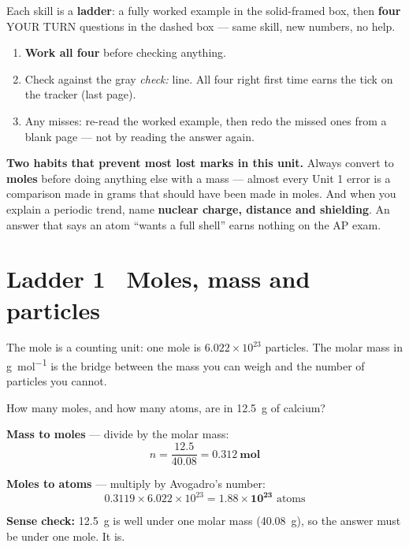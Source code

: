 \documentclass{apchem-worksheet}
\begin{document}
\apctitleblock

\begin{apcnote}
Each skill is a \textbf{ladder}: a fully worked example in the
solid-framed box, then \textbf{four} YOUR TURN questions in the dashed box
--- same skill, new numbers, no help.

\begin{enumerate}[leftmargin=*,itemsep=0.15em]
  \item \textbf{Work all four} before checking anything.
  \item Check against the gray \emph{check:} line. All four right first
        time earns the tick on the tracker (last page).
  \item Any misses: re-read the worked example, then redo the missed ones
        from a blank page --- not by reading the answer again.
\end{enumerate}

\textbf{Two habits that prevent most lost marks in this unit.} Always
convert to \textbf{moles} before doing anything else with a mass ---
almost every Unit 1 error is a comparison made in grams that should have
been made in moles. And when you explain a periodic trend, name
\textbf{nuclear charge, distance and shielding}. An answer that says an
atom ``wants a full shell'' earns nothing on the AP exam.
\end{apcnote}

\section*{\sffamily Ladder 1 \textbullet\ Moles, mass and particles}

The mole is a counting unit: one mole is
$6.022\times10^{23}$ particles. The molar mass in
\si{\gram\per\mole} is the bridge between the mass you can weigh and the
number of particles you cannot.

\begin{workedexample}
How many moles, and how many atoms, are in \SI{12.5}{\gram} of calcium?

\textbf{Mass to moles} --- divide by the molar mass:
\[ n = \frac{12.5}{40.08} = \mathbf{0.312~mol} \]

\textbf{Moles to atoms} --- multiply by Avogadro's number:
\[ 0.3119 \times 6.022\times10^{23} = \mathbf{1.88\times10^{23}}
   \text{ atoms} \]

\textbf{Sense check:} \SI{12.5}{\gram} is well under one molar mass
(\SI{40.08}{\gram}), so the answer must be under one mole. It is.
\end{workedexample}
\end{document}
